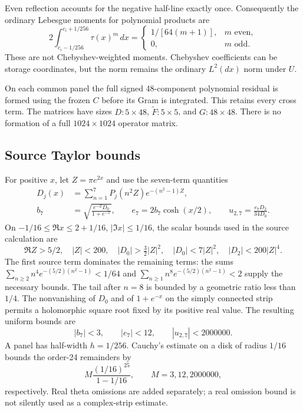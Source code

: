 \documentclass[11pt,a4paper]{article}
\numberwithin{equation}{section}
\theoremstyle{definition}\newtheorem{definition}[theorem]{Definition}
\theoremstyle{remark}\newtheorem{remark}[theorem]{Remark}
\begin{document}
Even reflection accounts for the negative half-line exactly once. Consequently the ordinary Lebesgue moments for polynomial products are
\begin{equation}\label{eq:panelmoments}
 2\int_{c_i-1/256}^{c_i+1/256}\tau(x)^m\,dx
 =\begin{cases}1/[64(m+1)],&m\text{ even},\\0,&m\text{ odd}.
 \end{cases}
\end{equation}
These are not Chebyshev-weighted moments. Chebyshev coefficients can be storage coordinates, but the norm remains the ordinary $L^2(dx)$ norm under $U$.

On each common panel the full signed 48-component polynomial residual is formed using the frozen $C$ before its Gram is integrated. This retains every cross term. The matrices have sizes $D:5\times48$, $\widetilde F:5\times5$, and $G:48\times48$. There is no formation of a full $1024\times1024$ operator matrix.

\subsection{Source Taylor bounds}
For positive $x$, let $Z=\pi e^{2x}$ and use the seven-term quantities
\begin{align}
 D_j(x)&=\sum_{n=1}^7P_j(n^2Z)e^{-(n^2-1)Z},\nonumber\\
 b_7&=\sqrt{\frac{e^{-Z}D_0}{1+e^{-x}}},\qquad
 e_7=2b_7\cosh(x/2),\qquad
 u_{2,7}=\frac{e_7D_2}{34D_0}.
\end{align}
On $-1/16\le\Re x\le2+1/16$, $|\Im x|\le1/16$, the scalar bounds used in the source calculation are
\begin{equation}\label{eq:complexbounds}
 \Re Z>5/2,\quad |Z|<200,\quad |D_0|>\tfrac32|Z|^2,
 \quad |D_0|<7|Z|^2,\quad |D_2|<200|Z|^4.
\end{equation}
The first source term dominates the remaining terms: the sums
$\sum_{n\ge2}n^4e^{-(5/2)(n^2-1)}<1/64$ and
$\sum_{n\ge1}n^8e^{-(5/2)(n^2-1)}<2$ supply the necessary bounds. The tail after $n=8$ is bounded by a geometric ratio less than $1/4$.
The nonvanishing of $D_0$ and of $1+e^{-x}$ on the simply connected strip permits a holomorphic square root fixed by its positive real value. The resulting uniform bounds are
\begin{equation}
 |b_7|<3,\qquad |e_7|<12,\qquad |u_{2,7}|<2000000.
\end{equation}
A panel has half-width $h=1/256$. Cauchy's estimate on a disk of radius $1/16$ bounds the order-24 remainders by
\begin{equation}\label{eq:cauchy}
 M\frac{(1/16)^{25}}{1-1/16},\qquad M=3,12,2000000,
\end{equation}
respectively. Real theta omissions are added separately; a real omission bound is not silently used as a complex-strip estimate.
\end{document}
